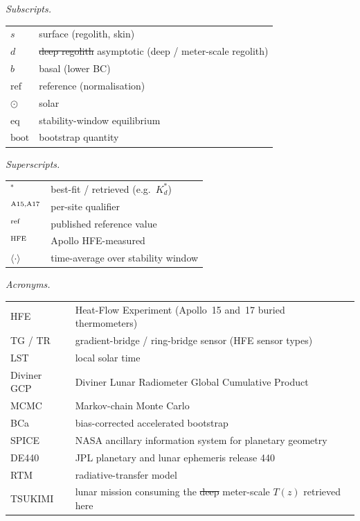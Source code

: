 \documentclass[11pt]{article}
\makeatletter
\let\sout@orig\sout
\renewcommand{\sout}[1]{\ifmmode\text{\sout@orig{\ensuremath{#1}}}\else\sout@orig{#1}\fi}
\newcommand{\new}[1]{\textcolor{green!60!black}{#1}}
\newcommand{\old}[1]{\textcolor{red!70!black}{\sout{#1}}}
\newcommand{\new}[1]{\textcolor{green!60!black}{#1}}
\newcommand{\old}[1]{}
\newcommand{\new}[1]{#1}
\newcommand{\old}[1]{}
\makeatother
\begin{document}
{\medskip
\begin{minipage}[t]{0.49\linewidth}
\textit{Subscripts.}\par\smallskip
\begin{tabular}{@{}ll@{}}
\toprule
$s$            & surface (regolith, skin) \\
$d$            & \old{deep regolith }\new{asymptotic (deep / meter-scale regolith) } \\
$b$            & basal (lower BC) \\
$\mathrm{ref}$ & reference (normalisation) \\
$\odot$        & solar \\
$\mathrm{eq}$  & stability-window equilibrium \\
$\mathrm{boot}$ & bootstrap quantity \\
\bottomrule
\end{tabular}
\end{minipage}\hfill
\begin{minipage}[t]{0.49\linewidth}
\textit{Superscripts.}\par\smallskip
\begin{tabular}{@{}ll@{}}
\toprule
$^{*}$            & best-fit / retrieved (e.g.\ $K_d^{*}$) \\
$^{\rm A15,A17}$  & per-site qualifier \\
$^{\rm ref}$      & published reference value \\
$^{\rm HFE}$      & Apollo HFE-measured \\
$\langle\cdot\rangle$ & time-average over stability window \\
\bottomrule
\end{tabular}
\end{minipage}

\medskip
\noindent\textit{Acronyms.}\par\smallskip\noindent
\begin{tabular}{@{}ll@{}}
\toprule
HFE          & Heat-Flow Experiment (Apollo~15 and~17 buried thermometers) \\
TG / TR      & gradient-bridge / ring-bridge sensor (HFE sensor types) \\
LST          & local solar time \\
Diviner GCP  & Diviner Lunar Radiometer Global Cumulative Product \\
MCMC         & Markov-chain Monte Carlo \\
BCa          & bias-corrected accelerated bootstrap \\
SPICE        & NASA ancillary information system for planetary geometry \\
DE440        & JPL planetary and lunar ephemeris release 440 \\
RTM          & radiative-transfer model \\
TSUKIMI      & lunar mission consuming the \old{deep }\new{meter-scale }$T(z)$ retrieved here \\
\bottomrule
\end{tabular}
}


\end{document}
